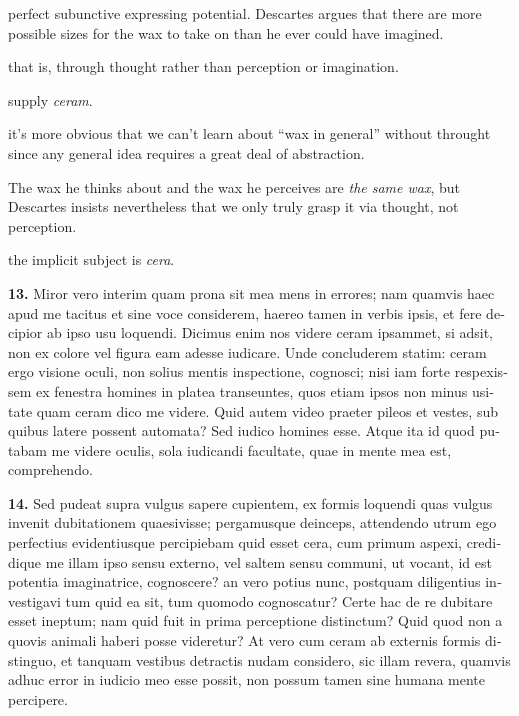  perfect subunctive expressing potential. Descartes argues that there are more possible sizes for the wax to take on than he ever could have imagined.

 that is, through thought rather than perception or imagination.

 supply \textit{ceram}.

 it's more obvious that we can't learn about ``wax in general'' without throught since any general idea requires a great deal of abstraction.

 The wax he thinks about and the wax he perceives are \textit{the same wax}, but Descartes insists nevertheless that we only truly grasp it via thought, not perception.

 the implicit subject is \textit{cera}.

\clearpage

\beginnumbering
\pstart
\begin{latin}
    \textenglish{\textbf{13.}} Miror vero interim quam prona sit mea mens in errores; nam quamvis haec apud me tacitus et sine voce considerem, haereo tamen in verbis ipsis, et fere decipior ab ipso usu loquendi. Dicimus enim nos videre ceram ipsammet, si adsit, non ex colore vel figura eam adesse iudicare. Unde concluderem statim: ceram ergo visione oculi, non solius mentis inspectione, cognosci; nisi iam forte respexissem ex fenestra homines in platea transeuntes, quos etiam ipsos non minus usitate quam ceram dico me videre. Quid autem video praeter pileos et vestes, sub quibus latere possent automata? Sed iudico homines esse. Atque ita id quod putabam me videre oculis, sola iudicandi facultate, quae in mente mea est, comprehendo.
\end{latin}
\pend
\endnumbering

\beginnumbering
\pstart
\begin{latin}
    \textenglish{\textbf{14.}} Sed pudeat supra vulgus sapere cupientem, ex formis loquendi quas vulgus invenit dubitationem quaesivisse; pergamusque deinceps, attendendo utrum ego perfectius evidentiusque percipiebam quid esset cera, cum primum aspexi, credidique me illam ipso sensu externo, vel saltem sensu communi, ut vocant, id est potentia imaginatrice, cognoscere? an vero potius nunc, postquam diligentius investigavi tum quid ea sit, tum quomodo cognoscatur? Certe hac de re dubitare esset ineptum; nam quid fuit in prima perceptione distinctum? Quid quod non a quovis animali haberi posse videretur? At vero cum ceram ab externis formis distinguo, et tanquam vestibus detractis nudam considero, sic illam revera, quamvis adhuc error in iudicio meo esse possit, non possum tamen sine humana mente percipere.
\end{latin}
\pend
\endnumbering

